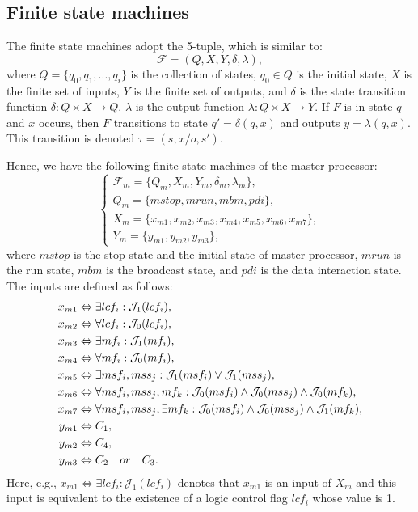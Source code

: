 \documentclass[journal,UTF8]{IEEEtran}
\begin{document}
 \subsection{Finite state machines}
 The finite state machines adopt the 5-tuple, which is similar to\cite{Hierons2016Parallel}:
 \begin{equation}
 \mathcal{F} = (Q, X, Y, \delta, \lambda),
 \end{equation}
where $Q = \{q_0, q_1,..., q_i\}$ is the collection of states, $q_0 \in Q$ is the initial state, $X$ is the finite set of inputs, $Y$ is the finite set of outputs, and $\delta$ is the state transition function $\delta: Q\times X \rightarrow Q$. $\lambda$ is the output function $\lambda: Q\times X\rightarrow Y$. If $F$ is in state $q$ and $x$ occurs, then $F$ transitions to state $q' = \delta(q, x)$ and outputs $y = \lambda(q, x)$. This transition is denoted $\tau = (s,x/o,s')$.
 
 Hence, we have the following finite state machines of the master processor:
  \begin{equation}
  \label{FMaster}
 \left\{
 \begin{array}{l}
 \mathcal{F}_{m} = \{Q_m, X_m, Y_m,\delta_m, \lambda_m\},\\
 Q_m = \{mstop, mrun, mbm, pdi\},\\
 X_m = \{x_{m1}, x_{m2}, x_{m3}, x_{m4}, x_{m5}, x_{m6}, x_{m7}\},\\
 Y_m = \{y_{m1}, y_{m2}, y_{m3}\},
 \end{array}
 \right.
 \end{equation}
 where $mstop$ is the stop state and the initial state of master processor, $mrun$ is the run state, $mbm$ is the broadcast state, and $pdi$ is the data interaction state. The inputs are defined as follows:
 \begin{align}
 \notag x_{m1}&\Leftrightarrow \exists lcf_i: \mathcal{J}_1(lcf_i),\\
\notag x_{m2}&\Leftrightarrow  \forall lcf_i: \mathcal{J}_0(lcf_i),\\
\notag x_{m3}&\Leftrightarrow \exists mf_i: \mathcal{J}_1(mf_i),\\
\notag x_{m4}&\Leftrightarrow \forall mf_i: \mathcal{J}_0(mf_i),\\
\notag x_{m5}&\Leftrightarrow \exists msf_i, mss_j: \mathcal{J}_1(msf_i) \lor \mathcal{J}_1(mss_j),\\
\notag x_{m6}&\Leftrightarrow \forall msf_i, mss_j, mf_k: \mathcal{J}_0(msf_i) \land \mathcal{J}_0(mss_j) \land \mathcal{J}_0(mf_k),\\
\notag x_{m7}&\Leftrightarrow \forall msf_i, mss_j, \exists mf_k: \mathcal{J}_0(msf_i) \land \mathcal{J}_0(mss_j) \land \mathcal{J}_1(mf_k),\\
\notag y_{m1}&\Leftrightarrow C_1,\\
\notag y_{m2}&\Leftrightarrow C_4,\\
\notag y_{m3}&\Leftrightarrow C_2\quad or\quad C_3.
 \end{align}
Here, e.g., $x_{m1}\Leftrightarrow \exists lcf_i: \mathcal{J}_1(lcf_i)$ denotes that $x_{m1}$ is an input of $X_m$ and this input is equivalent to the existence of a logic control flag $lcf_i$ whose value is 1.
\end{document}
